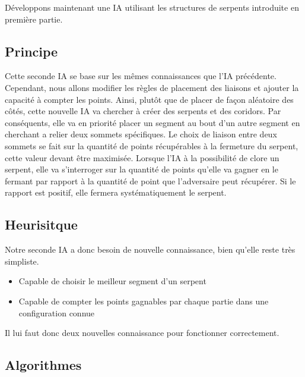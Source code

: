 \documentclass[a4paper,12pt]{report}
\begin{document}
D\'eveloppons maintenant une IA utilisant les structures de serpents introduite en premi\`ere partie. 

\subsection{Principe}

Cette seconde IA se base sur les m\^emes connaissances que l'IA pr\'ec\'edente. Cependant, nous allons modifier les r\`egles de placement des liaisons et ajouter la capacit\'e \`a compter les points. Ainsi, plut\^ot que de placer de fa\c{c}on al\'eatoire des c\^ot\'es, cette nouvelle IA va chercher \`a cr\'eer des serpents et des coridors. Par cons\'equents, elle va en priorit\'e placer un segment au bout d'un autre segment en cherchant a relier deux sommets sp\'ecifiques. Le choix de liaison entre deux sommets se fait sur la quantit\'e de points r\'ecup\'erables \`a la fermeture du serpent, cette valeur devant \^etre maximis\'ee. Lorsque l'IA \`a la possibilit\'e de clore un serpent, elle va s'interroger sur la quantit\'e de points qu'elle va gagner en le fermant par rapport \`a la quantit\'e de point que l'adversaire peut r\'ecup\'erer. Si le rapport est positif, elle fermera syst\'ematiquement le serpent.

\subsection{Heurisitque}

Notre seconde IA a donc besoin de nouvelle connaissance, bien qu'elle reste tr\`es simpliste.

\begin{itemize}
 \item Capable de choisir le meilleur segment d'un serpent
 \item Capable de compter les points gagnables par chaque partie dans une configuration connue
\end{itemize}

Il lui faut donc deux nouvelles connaissance pour fonctionner correctement.

\subsection{Algorithmes}
\end{document}
